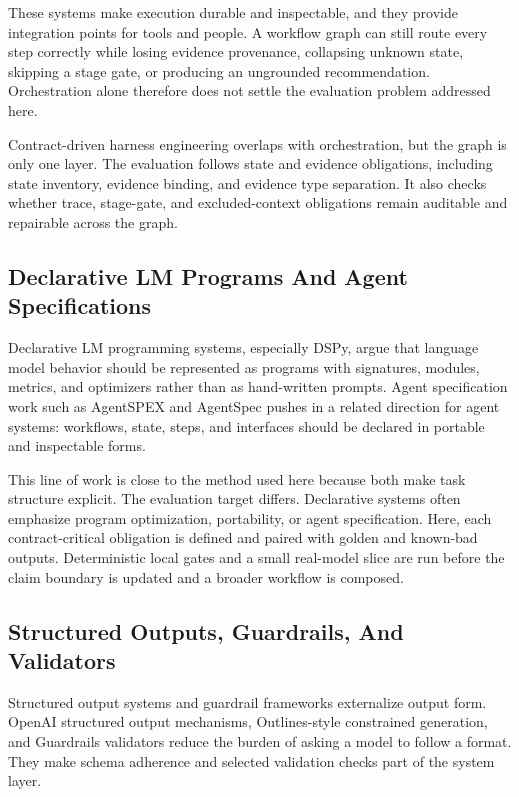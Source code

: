 \documentclass[11pt]{article}
\begin{document}
These systems make execution durable and inspectable, and they provide integration points for tools and people. A workflow graph can still route every step correctly while losing evidence provenance, collapsing unknown state, skipping a stage gate, or producing an ungrounded recommendation. Orchestration alone therefore does not settle the evaluation problem addressed here.

Contract-driven harness engineering overlaps with orchestration, but the graph is only one layer. The evaluation follows state and evidence obligations, including state inventory, evidence binding, and evidence type separation. It also checks whether trace, stage-gate, and excluded-context obligations remain auditable and repairable across the graph.

\subsection{Declarative LM Programs And Agent Specifications}

Declarative LM programming systems, especially DSPy, argue that language model behavior should be represented as programs with signatures, modules, metrics, and optimizers rather than as hand-written prompts. Agent specification work such as AgentSPEX and AgentSpec pushes in a related direction for agent systems: workflows, state, steps, and interfaces should be declared in portable and inspectable forms. \cite{P2_EXT_DSPY,P2_EXT_AGENTSPEX,P2_EXT_AGENTSPEC}

This line of work is close to the method used here because both make task structure explicit. The evaluation target differs. Declarative systems often emphasize program optimization, portability, or agent specification. Here, each contract-critical obligation is defined and paired with golden and known-bad outputs. Deterministic local gates and a small real-model slice are run before the claim boundary is updated and a broader workflow is composed.

\subsection{Structured Outputs, Guardrails, And Validators}

Structured output systems and guardrail frameworks externalize output form. OpenAI structured output mechanisms, Outlines-style constrained generation, and Guardrails validators reduce the burden of asking a model to follow a format. They make schema adherence and selected validation checks part of the system layer. \cite{P2_EXT_OPENAI_STRUCTURED_OUTPUTS,P2_EXT_OUTLINES,P2_EXT_GUARDRAILS}
\end{document}
